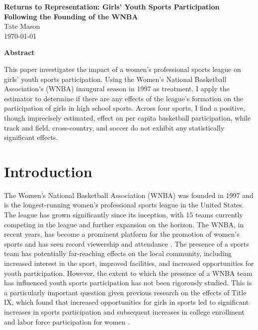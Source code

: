 \documentclass[11pt]{article}
\newcommand{\Title}{Returns to Representation: Girls' Youth Sports Participation Following the Founding of the WNBA}
\newcommand{\Author}{Tate Mason}
\newcommand{\Date}{\today}
\newcommand{\1}[1]{\mathbb{I}\{#1\}}
\theoremstyle{plain}
\begin{document}
\vspace{0.5em}

\begin{titlepage}
    \centering
    \vspace*{2cm}
    
\begin{center}
  {\large \textbf{\Title}}\\[0.5em]
  {\large \Author}\\[0.25em]
  {\Date}
\end{center}
    \vspace{2cm}
    
    \begin{minipage}{0.85\textwidth}
        \begin{center}
            \textbf{Abstract}
        \end{center}
        This paper investigates the impact of a women's professional sports league on girls' youth sports participation. Using the Women's National Basketball Association's (WNBA) inaugural season in 1997 as treatment, I apply the \cite{csa_2021} estimator to determine if there are any effects of the league's formation on the participation of girls in high school sports. Across four sports, I find a positive, though imprecisely estimated, effect on per capita basketball participation, while track and field, cross-country, and soccer do not exhibit any statistically significant effects.
    \end{minipage}
    
    \vfill
\end{titlepage}

\section{Introduction}

The Women's National Basketball Association (WNBA) was founded in 1997 and is the longest-running women's professional sports league in the United States. The league has grown significantly since its inception, with 15 teams currently competing in the league and further expansion on the horizon. The WNBA, in recent years, has become a prominent platform for the promotion of women's sports and has seen record viewership and attendance \citep{wnba_record_2024}. The presence of a sports team has potentially far-reaching effects on the local community, including increased interest in the sport, improved facilities, and increased opportunities for youth participation. However, the extent to which the presence of a WNBA team has influenced youth sports participation has not been rigorously studied. This is a particularly important question given previous research on the effects of Title IX, which found that increased opportunities for girls in sports led to significant increases in sports participation and subsequent increases in college enrollment and labor force participation for women \cite{stevenson_beyond_2010}.
\end{document}
